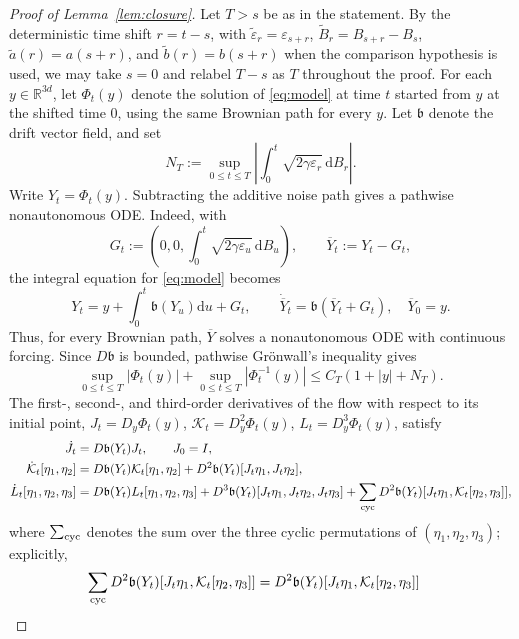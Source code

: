 \documentclass[11pt]{article}
\theoremstyle{definition}
\newcommand{\R}{\mathbb R}
\newcommand{\dd}{\mathrm d}
\newcommand{\eps}{\varepsilon}
\begin{document}
\begin{proof}[Proof of Lemma~\ref{lem:closure}]
Let $T>s$ be as in the statement. By the deterministic time shift $r=t-s$, with
$\widetilde\eps_r=\eps_{s+r}$,
$\widetilde B_r=B_{s+r}-B_s$,
$\widetilde a(r)=a(s+r)$, and $\widetilde b(r)=b(s+r)$ when the comparison
hypothesis is used, we may take $s=0$ and relabel $T-s$ as $T$ throughout
the proof. For each $y\in\R^{3d}$, let $\Phi_t(y)$ denote the solution of
\eqref{eq:model} at time $t$ started from $y$ at the shifted time $0$, using
the same Brownian path for every $y$. Let $\mathfrak b$ denote the drift
vector field, and set
\[
 N_T:=\sup_{0\leq t\leq T}\left|\int_0^t\sqrt{2\gamma\eps_r}\,\dd B_r\right|.
\]
Write $Y_t=\Phi_t(y)$. Subtracting the additive noise path gives a
pathwise nonautonomous ODE.
Indeed, with
\[
 G_t:=\left(0,0,\int_0^t\sqrt{2\gamma\eps_u}\,\dd B_u\right),
 \qquad \overline Y_t:=Y_t-G_t,
\]
the integral equation for \eqref{eq:model} becomes
\[
 Y_t=y+\int_0^t\mathfrak b(Y_u)\dd u+G_t,
 \qquad
 \dot{\overline Y}_t=\mathfrak b\left(\overline Y_t+G_t\right),
 \quad \overline Y_0=y.
\]
Thus, for every Brownian path, $\overline Y$ solves a nonautonomous ODE with
continuous forcing. Since $D\mathfrak b$ is bounded,
pathwise Gr\"{o}nwall's inequality gives
\begin{equation}\label{eq:pathwise-flow-growth}
 \sup_{0\leq t\leq T}|\Phi_t(y)|
 +\sup_{0\leq t\leq T}\left|\Phi_t^{-1}(y)\right|
 \leq C_T(1+|y|+N_T).
\end{equation}
The first-, second-, and third-order derivatives of the flow with respect to
its initial point,
$J_t=D_y\Phi_t(y)$,
$\mathcal K_t=D_y^2\Phi_t(y)$,
$L_t=D_y^3\Phi_t(y)$,
satisfy
\begin{align*}
 \dot J_t&=D\mathfrak b(Y_t)J_t,\qquad J_0=I,\\
 \dot{\mathcal K}_t[\eta_1,\eta_2]
 &=D\mathfrak b(Y_t)\mathcal K_t[\eta_1,\eta_2]
   +D^2\mathfrak b(Y_t)[J_t\eta_1,J_t\eta_2],\\
 \dot L_t[\eta_1,\eta_2,\eta_3]
 &=D\mathfrak b(Y_t)L_t[\eta_1,\eta_2,\eta_3]
   +D^3\mathfrak b(Y_t)[J_t\eta_1,J_t\eta_2,J_t\eta_3]+\sum_{\rm cyc}D^2\mathfrak b(Y_t)
       [J_t\eta_1,\mathcal K_t[\eta_2,\eta_3]],
\end{align*}
where $\sum_{\rm cyc}$ denotes the sum over the three cyclic permutations of
$(\eta_1,\eta_2,\eta_3)$; explicitly, 
\[
\begin{aligned}
 \sum_{\rm cyc}D^2\mathfrak b(Y_t)
       [J_t\eta_1,\mathcal K_t[\eta_2,\eta_3]]&=D^2\mathfrak b(Y_t)[J_t\eta_1,\mathcal K_t[\eta_2,\eta_3]]

\end{aligned}\]
\end{proof}
\end{document}
